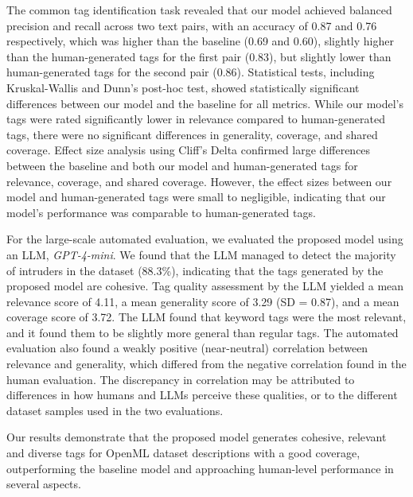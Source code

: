 The common tag identification task revealed that our model achieved balanced precision and recall across two text pairs, with an accuracy of 0.87 and 0.76 respectively, which was higher than the baseline (0.69 and 0.60), slightly higher than the human-generated tags for the first pair (0.83), but slightly lower than human-generated tags for the second pair (0.86). Statistical tests, including Kruskal-Wallis and Dunn's post-hoc test, showed statistically significant differences between our model and the baseline for all metrics. While our model's tags were rated significantly lower in relevance compared to human-generated tags, there were no significant differences in generality, coverage, and shared coverage. Effect size analysis using Cliff's Delta confirmed large differences between the baseline and both our model and human-generated tags for relevance, coverage, and shared coverage. However, the effect sizes between our model and human-generated tags were small to negligible, indicating that our model's performance was comparable to human-generated tags.

For the large-scale automated evaluation, we evaluated the proposed model using an LLM, \textit{GPT-4-mini}. We found that the LLM managed to detect the majority of intruders in the dataset (88.3\%), indicating that the tags generated by the proposed model are cohesive. Tag quality assessment by the LLM yielded a mean relevance score of 4.11, a mean generality score of 3.29 (SD = 0.87), and a mean coverage score of 3.72. The LLM found that keyword tags were the most relevant, and it found them to be slightly more general than regular tags. The automated evaluation also found a weakly positive (near-neutral) correlation between relevance and generality, which differed from the negative correlation found in the human evaluation. The discrepancy in correlation may be attributed to differences in how humans and LLMs perceive these qualities, or to the different dataset samples used in the two evaluations.

Our results demonstrate that the proposed model generates cohesive, relevant and diverse tags for OpenML dataset descriptions with a good coverage, outperforming the baseline model and approaching human-level performance in several aspects.